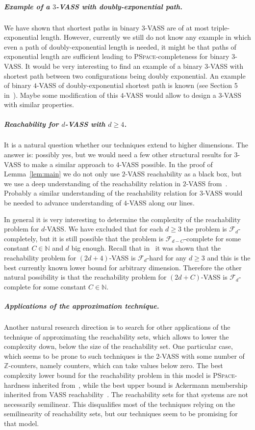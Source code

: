 \documentclass[a4paper, UKenglish, cleveref, autoref, thm-restate]{lipics-v2021}
\newcommand{\F}{\mathcal{F}}
\newcommand{\N}{\mathbb{N}}
\newcommand{\Z}{\mathbb{Z}}
\newcommand{\pspace}{\textsc{PSpace}\xspace}
\newcommand{\para}[1]{\vspace{-3mm}\subparagraph*{\bf #1.}}
\begin{document}
\para{Example of a $3$-VASS with doubly-exponential path}
We have shown that shortest paths in binary $3$-VASS are of at most triple-exponential length.
However, currently we still do not know any example in which even a path of doubly-exponential length is needed,
it might be that paths of exponential length are sufficient leading to \pspace-completeness for binary $3$-VASS.
It would be very interesting to find an example of a binary $3$-VASS with shortest path between two configurations
being doubly exponential. An example of binary $4$-VASS of doubly-exponential shortest path is known (see Section 5 in~\cite{DBLP:conf/concur/Czerwinski0LLM20}). Maybe some modification of this $4$-VASS would allow to design a $3$-VASS with similar properties.

\para{Reachability for $d$-VASS with $d \geq 4$}
It is a natural question whether our techniques extend to higher dimensions.
The answer is: possibly yes, but we would need a few other structural results for $3$-VASS
to make a similar approach to $4$-VASS possible. In the proof of Lemma~\ref{lem:main} we do not only
use $2$-VASS reachability as a black box, but we use a deep understanding of the reachability relation in $2$-VASS
from~\cite{DBLP:conf/focs/0001CMOSW24}. Probably a similar understanding of the reachability relation for $3$-VASS would be needed
to advance understanding of $4$-VASS along our lines. 

In general it is very interesting to determine the complexity of the reachability problem for $d$-VASS.
We have excluded that for each $d \geq 3$ the problem is $\F_d$-completely, but it is still possible that
the problem is $\F_{d-C}$-complete for some constant $C \in \N$ and $d$ big enough.
Recall that in~\cite{DBLP:conf/fsttcs/CzerwinskiJ0LO23}
it was shown that the reachability problem for $(2d+4)$-VASS is $\F_d$-hard for any $d \geq 3$ and this
is the best currently known lower bound for arbitrary dimension.
Therefore the other natural possibility is that the reachability problem for $(2d+C)$-VASS is $\F_d$-complete for some
constant $C \in \N$. 

\para{Applications of the approximation technique}
Another natural research direction is to search for other applications of the technique of approximating the reachability sets,
which allows to lower the complexity down, below the size of the reachability set.
One particular case, which seems to be prone to such techniques is the $2$-VASS with some number of $\Z$-counters, namely counters, which can take values below zero.
The best complexity lower bound for the reachability problem in this model is \pspace-hardness inherited from~\cite{BlondinFGHM15},
while the best upper bound is Ackermann membership inherited from VASS reachability~\cite{LS19}.
The reachability sets for that systems are not necessarily semilinear.
This disqualifies most of the techniques relying on the semilinearity of reachability sets, but our techniques
seem to be promising for that model.
\end{document}
